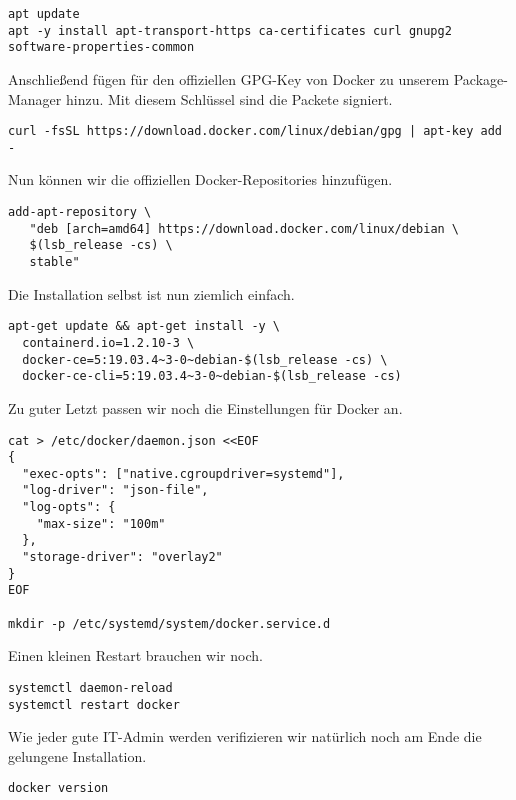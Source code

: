 \begin{lstlisting}
apt update
apt -y install apt-transport-https ca-certificates curl gnupg2 software-properties-common
\end{lstlisting}

Anschließend fügen für den offiziellen GPG-Key von Docker zu unserem
Package-Manager hinzu. Mit diesem Schlüssel sind die Packete signiert.

\begin{lstlisting}
curl -fsSL https://download.docker.com/linux/debian/gpg | apt-key add -
\end{lstlisting}

Nun können wir die offiziellen Docker-Repositories hinzufügen.

\begin{lstlisting}
add-apt-repository \
   "deb [arch=amd64] https://download.docker.com/linux/debian \
   $(lsb_release -cs) \
   stable"
\end{lstlisting}

Die Installation selbst ist nun ziemlich einfach.

\begin{lstlisting}
apt-get update && apt-get install -y \
  containerd.io=1.2.10-3 \
  docker-ce=5:19.03.4~3-0~debian-$(lsb_release -cs) \
  docker-ce-cli=5:19.03.4~3-0~debian-$(lsb_release -cs)
\end{lstlisting}

Zu guter Letzt passen wir noch die Einstellungen für Docker an.

\begin{lstlisting}
cat > /etc/docker/daemon.json <<EOF
{
  "exec-opts": ["native.cgroupdriver=systemd"],
  "log-driver": "json-file",
  "log-opts": {
    "max-size": "100m"
  },
  "storage-driver": "overlay2"
}
EOF

mkdir -p /etc/systemd/system/docker.service.d
\end{lstlisting}

Einen kleinen Restart brauchen wir noch.

\begin{lstlisting}
systemctl daemon-reload
systemctl restart docker
\end{lstlisting}

Wie jeder gute IT-Admin werden verifizieren wir natürlich noch am Ende
die gelungene Installation.

\begin{lstlisting}
docker version
\end{lstlisting}

